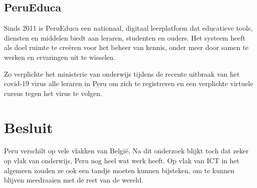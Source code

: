 \subsection{PeruEduca}
Sinds 2011 is PeruEduca een nationaal, digitaal leerplatform dat educatieve tools, diensten en middelen biedt aan leraren, studenten en ouders. Het systeem heeft als doel ruimte te creëren voor het beheer van kennis, onder meer door samen te werken en ervaringen uit te wisselen. \autocite{EducationPeru2020}

Zo verplichte het ministerie van onderwijs tijdens de recente uitbraak van het covid-19 virus alle leraren in Peru om zich te registreren en een verplichte virtuele cursus tegen het virus te volgen. \autocite{Educacion2020}

\section{Besluit}
Peru verschilt op vele vlakken van België. Na dit onderzoek blijkt toch dat zeker op vlak van onderwijs, Peru nog heel wat werk heeft. Op vlak van ICT in het algemeen zouden ze ook een tandje moeten kunnen bijsteken, om te kunnen blijven meedraaien met de rest van de wereld. 



